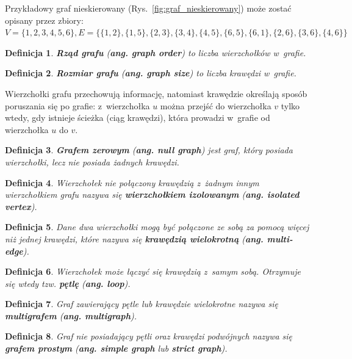 \documentclass[twoside,12pt]{report}
\newtheorem{definition}{Definicja} %
\begin{document}
Przykładowy graf nieskierowany (Rys.~\ref{fig:graf_nieskierowany}) może zostać opisany przez zbiory:
$
V=\{1,2,3,4,5,6\}, 
E=\{\{1,2\},\{1,5\},\{2,3\},\{3,4\},\{4,5\},\{6,5\},\{6,1\},\{2,6\},\{3,6\},\{4,6\}\}
$

\begin{definition}
\textbf{Rząd grafu} (\textbf{ang. graph order}) to liczba wierzchołków w~grafie.
\end{definition}

\begin{definition}
\textbf{Rozmiar grafu} (\textbf{ang. graph size}) to liczba krawędzi w~grafie.
\end{definition}

Wierzchołki grafu przechowują informację, natomiast krawędzie określają sposób poruszania się po grafie: z~wierzchołka $u$ można przejść do wierzchołka $v$ tylko wtedy, gdy istnieje ścieżka (ciąg krawędzi), która prowadzi w~grafie od wierzchołka $u$ do $v$.

\begin{definition}
\textbf{Grafem zerowym} (\textbf{ang. null graph}) jest graf, który posiada wierzchołki, lecz nie posiada żadnych krawędzi.
\end{definition}

\begin{definition}
Wierzchołek nie połączony krawędzią z~żadnym innym wierzchołkiem grafu nazywa się \textbf{wierzchołkiem izolowanym} (\textbf{ang. isolated vertex}).
\end{definition}

\begin{definition}
Dane dwa wierzchołki mogą być połączone ze sobą za pomocą więcej niż jednej krawędzi, które nazywa się \textbf{krawędzią wielokrotną} (\textbf{ang. multi-edge}).
\end{definition}

\begin{definition}
Wierzchołek może łączyć się krawędzią z~samym sobą. Otrzymuje się wtedy tzw. \textbf{pętlę} (\textbf{ang. loop}). 
\end{definition}

\begin{definition}
Graf zawierający pętle lub krawędzie wielokrotne nazywa się \textbf{multigrafem} (\textbf{ang. multigraph}).
\end{definition}

\begin{definition}
Graf nie posiadający pętli oraz krawędzi podwójnych nazywa się \textbf{grafem prostym} (\textbf{ang. simple graph} lub \textbf{strict graph}).
\end{definition}
\end{document}
